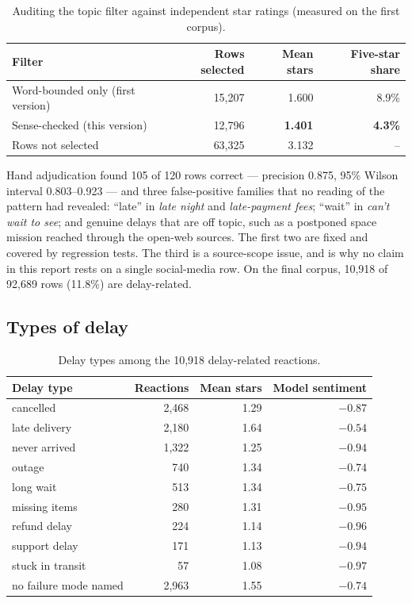 \documentclass[11pt,a4paper]{article}
\begin{document}
\begin{table}[htbp]\centering\small
\caption{Auditing the topic filter against independent star ratings (measured on the first corpus).}\label{tab:relevance}
\begin{tabular}{@{}lrrr@{}}
\toprule
Filter & Rows selected & Mean stars & Five-star share\\
\midrule
Word-bounded only (first version) & 15,207 & 1.600 & 8.9\%\\
Sense-checked (this version) & 12,796 & \textbf{1.401} & \textbf{4.3\%}\\
Rows not selected & 63,325 & 3.132 & --\\
\bottomrule
\end{tabular}
\end{table}

Hand adjudication found 105 of 120 rows correct --- precision 0.875, 95\% Wilson interval 0.803--0.923 --- and three false-positive families that no reading of the pattern had revealed: ``late'' in \emph{late night} and \emph{late-payment fees}; ``wait'' in \emph{can't wait to see}; and genuine delays that are off topic, such as a postponed space mission reached through the open-web sources. The first two are fixed and covered by regression tests. The third is a source-scope issue, and is why no claim in this report rests on a single social-media row. On the final corpus, 10,918 of 92,689 rows (11.8\%) are delay-related.

\subsection{Types of delay}

\begin{table}[htbp]\centering\small
\caption{Delay types among the 10,918 delay-related reactions.}\label{tab:delaytypes}
\begin{tabular}{@{}lrrr@{}}
\toprule
Delay type & Reactions & Mean stars & Model sentiment\\
\midrule
cancelled & 2,468 & 1.29 & $-0.87$\\
late delivery & 2,180 & 1.64 & $-0.54$\\
never arrived & 1,322 & 1.25 & $-0.94$\\
outage & 740 & 1.34 & $-0.74$\\
long wait & 513 & 1.34 & $-0.75$\\
missing items & 280 & 1.31 & $-0.95$\\
refund delay & 224 & 1.14 & $-0.96$\\
support delay & 171 & 1.13 & $-0.94$\\
stuck in transit & 57 & 1.08 & $-0.97$\\
\midrule
no failure mode named & 2,963 & 1.55 & $-0.74$\\
\bottomrule
\end{tabular}
\end{table}
\end{document}
